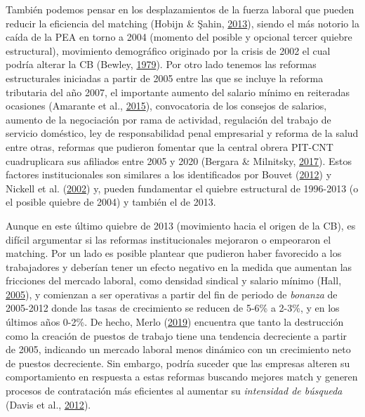 \documentclass[12pt,oneside]{reedthesis}
\begin{document}
También podemos pensar en los desplazamientos de la fuerza laboral que pueden reducir la eficiencia del matching (Hobijn \& Şahin, \protect\hyperlink{ref-Hobijn2013}{2013}), siendo el más notorio la caída de la PEA en torno a 2004 (momento del posible y opcional tercer quiebre estructural), movimiento demográfico originado por la crisis de 2002 el cual podría alterar la CB (Bewley, \protect\hyperlink{ref-Bewley1979}{1979}). Por otro lado tenemos las reformas estructurales iniciadas a partir de 2005 entre las que se incluye la reforma tributaria del año 2007, el importante aumento del salario mínimo en reiteradas ocasiones (Amarante et al., \protect\hyperlink{ref-Amarante2015}{2015}), convocatoria de los consejos de salarios, aumento de la negociación por rama de actividad, regulación del trabajo de servicio doméstico, ley de responsabilidad penal empresarial y reforma de la salud entre otras, reformas que pudieron fomentar que la central obrera PIT-CNT cuadruplicara sus afiliados entre 2005 y 2020 (Bergara \& Milnitsky, \protect\hyperlink{ref-Bergara2017}{2017}). Estos factores institucionales son similares a los identificados por Bouvet (\protect\hyperlink{ref-Bouvet2012}{2012}) y Nickell et al. (\protect\hyperlink{ref-Nickell2002}{2002}) y, pueden fundamentar el quiebre estructural de 1996-2013 (o el posible quiebre de 2004) y también el de 2013.

Aunque en este último quiebre de 2013 (movimiento hacia el origen de la CB), es difícil argumentar si las reformas institucionales mejoraron o empeoraron el matching. Por un lado es posible plantear que pudieron haber favorecido a los trabajadores y deberían tener un efecto negativo en la medida que aumentan las fricciones del mercado laboral, como densidad sindical y salario mínimo (Hall, \protect\hyperlink{ref-Hall2005}{2005}), y comienzan a ser operativas a partir del fin de periodo de \emph{bonanza} de 2005-2012 donde las tasas de crecimiento se reducen de 5-6\% a 2-3\%, y en los últimos años 0-2\%. De hecho, Merlo (\protect\hyperlink{ref-Merlo2019}{2019}) encuentra que tanto la destrucción como la creación de puestos de trabajo tiene una tendencia decreciente a partir de 2005, indicando un mercado laboral menos dinámico con un crecimiento neto de puestos decreciente.
Sin embargo, podría suceder que las empresas alteren su comportamiento en respuesta a estas reformas buscando mejores match y generen procesos de contratación más eficientes al aumentar su \emph{intensidad de búsqueda} (Davis et al., \protect\hyperlink{ref-Haltiwanger2012}{2012}).
\end{document}
